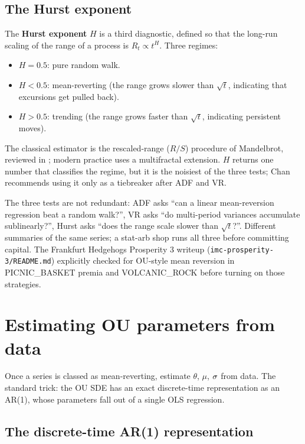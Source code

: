 \subsection{The Hurst exponent}
\label{subsec:ch9_hurst}

The \textbf{Hurst exponent} $H$ is a third diagnostic, defined so
that the long-run scaling of the range of a process is
$R_t \propto t^H$. Three regimes:
\begin{itemize}
  \item $H = 0.5$: pure random walk.
  \item $H < 0.5$: mean-reverting (the range grows slower than
  $\sqrt{t}$, indicating that excursions get pulled back).
  \item $H > 0.5$: trending (the range grows faster than
  $\sqrt{t}$, indicating persistent moves).
\end{itemize}
The classical estimator is the rescaled-range ($R/S$) procedure
of Mandelbrot, reviewed in \citeChan{}; modern practice uses a
multifractal extension. $H$ returns one number that classifies
the regime, but it is the noisiest of the three tests; Chan
recommends using it only as a tiebreaker after ADF and VR.

The three tests are not redundant: ADF asks ``can a linear
mean-reversion regression beat a random walk?'', VR asks ``do
multi-period variances accumulate sublinearly?'', Hurst asks
``does the range scale slower than $\sqrt{t}$?''. Different
summaries of the same series; a stat-arb shop runs all three
before committing capital. The Frankfurt Hedgehogs Prosperity 3
writeup (\texttt{imc-prosperity-3/README.md}) explicitly checked
for OU-style mean reversion in PICNIC\_BASKET premia and
VOLCANIC\_ROCK before turning on those strategies.

\section{Estimating OU parameters from data}
\label{sec:ch9_fit}

Once a series is classed as mean-reverting, estimate $\theta$,
$\mu$, $\sigma$ from data. The standard trick: the OU SDE has an
exact discrete-time representation as an AR(1), whose parameters
fall out of a single OLS regression.

\subsection{The discrete-time AR(1) representation}
\label{subsec:ch9_ar1}

